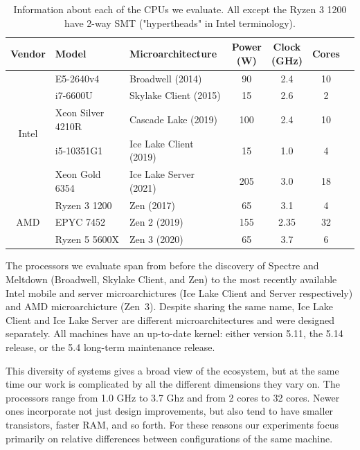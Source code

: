 \begin{table}[t]
    \begin{center}
    \begin{tabular}{ cllcccc }
      \textbf{Vendor} & \textbf{Model} & \textbf{Microarchitecture} & \shortstack{\textbf{Power} \\ \textbf{(W)}} & \shortstack{\textbf{Clock} \\ \textbf{(GHz)}} & \textbf{Cores} \\ \hline 
        \multirow{5}{*}{Intel} & E5-2640v4         & Broadwell (2014)          & 90 & 2.4 & 10 \\
                               & i7-6600U          & Skylake Client (2015)   & 15 & 2.6 & 2 \\
                               & Xeon Silver 4210R & Cascade Lake (2019)       & 100 & 2.4 & 10 \\
                               & i5-10351G1        & Ice Lake Client (2019)  & 15 & 1.0 & 4 \\
                               & Xeon Gold 6354    & Ice Lake Server (2021)  & 205 & 3.0 & 18 \\ \hline
        \multirow{3}{*}{AMD}   & Ryzen 3 1200      & Zen (2017)                & 65 & 3.1 & 4 \\
                               & EPYC 7452         & Zen 2 (2019)              & 155 & 2.35 & 32 \\
                               & Ryzen 5 5600X     & Zen 3 (2020)              & 65 & 3.7 & 6 \\ \hline
    \end{tabular}
    \end{center}
    \caption{Information about each of the CPUs we evaluate. All except the Ryzen 3 1200 have 2-way SMT ("hypertheads" in Intel terminology).}
    \label{fig:cpus}
  \end{table}

The processors we evaluate span from before the discovery of Spectre and Meltdown (Broadwell, Skylake Client, and Zen) to the most recently available Intel mobile and server microarchictures (Ice Lake Client and Server respectively) and AMD microarchicture (Zen~3).
Despite sharing the same name, Ice Lake Client and Ice Lake Server are different microarchitectures and were designed separately.
All machines have an up-to-date kernel: either version 5.11, the 5.14 release, or the 5.4 long-term maintenance release.

This diversity of systems gives a broad view of the ecosystem, but at the same time our work is complicated by all the different dimensions they vary on.
The processors range from 1.0 GHz to 3.7 Ghz and from 2 cores to 32 cores.
Newer ones incorporate not just design improvements, but also tend to have smaller transistors, faster RAM, and so forth.
For these reasons our experiments focus primarily on relative differences between configurations of the same machine.

